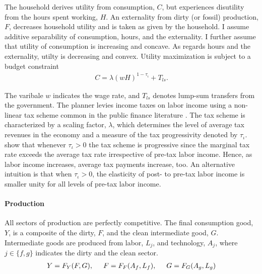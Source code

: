 The household derives utility from consumption, $C$, but experiences disutility from the hours spent working, $H$. An externality from dirty (or fossil) production, $F$, decreases household utility and is taken as given by the household.
I assume additive separability of consumption, hours, and the externality. I further assume that utility of consumption is increasing and concave. As regards hours and the externality, utilty is decreasing and convex.
Utility maximization is subject to a budget constraint
\begin{align}
	 C= \lambda(wH)^{1-\tau_{\iota}}+T_{ls}. \label{eq:hhbudget}
\end{align}

The varibale $w$ indicates the wage rate, and $T_{ls}$ denotes lump-sum transfers from the government.
The planner levies income taxes on labor income using a non-linear tax scheme common in the public finance literature \citep{Heathcote2017OptimalFramework, Benabou2002TaxEfficiency}. The tax scheme is
characterized by a scaling factor, $\lambda$, which determines the level of average tax revenues in the economy and a measure of the tax progressivity denoted by $\tau_{\iota}$. 
\cite{Heathcote2017OptimalFramework} show that whenever $\tau_{\iota}>0$ the tax scheme is progressive since the marginal tax rate exceeds the average tax rate irrespective of  pre-tax labor income. Hence, as labor income increases, average tax payments increase, too. An alternative intuition is that when $\tau_{\iota}>0$, the elasticity of post- to pre-tax labor income is smaller unity for all levels of pre-tax labor income.  %

\paragraph{Production}
All sectors of production are perfectly competitive. The final consumption good, $Y$, is a composite of the dirty, $F$, and the clean intermediate good, $G$. 
Intermediate goods are produced from labor, $L_j$, and technology, $A_j$, where $j\in \{f,g\}$ indicates the dirty and the clean sector.
\begin{align}
Y=F_Y(F, G), \hspace{5mm} F=F_F(A_f, L_f),\hspace{5mm} G=F_G(A_g, L_g) \label{eq:prod}
\end{align}

